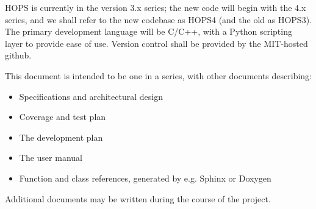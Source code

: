 \acs{HOPS} is currently in the version 3.x series; the new code will
begin with the 4.x series, and we shall refer to the new codebase as HOPS4
(and the old as HOPS3). The primary development language will be C/C++, 
with a Python scripting layer to provide ease of use. Version control shall be 
provided by the MIT-hosted github. 









This document is intended to be one in a series, with other documents
describing:
\begin{itemize}
\item Specifications and architectural design
\item Coverage and test plan
\item The development plan
\item The user manual
\item Function and class references, generated by e.g. Sphinx or Doxygen
\end{itemize}
Additional documents may be written during the course of the project.



%
%

